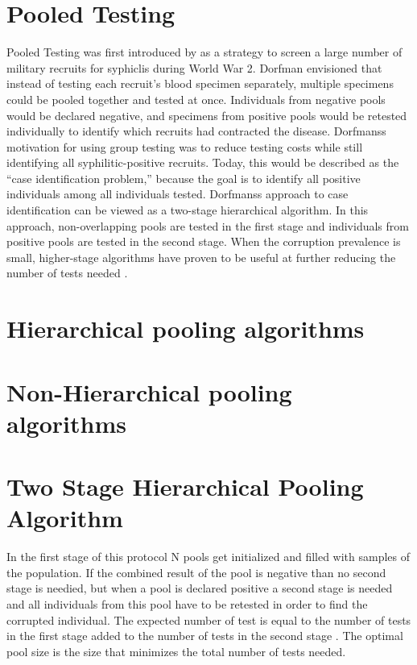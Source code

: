 \section{Pooled Testing}
Pooled Testing was first introduced by \cite{dorfman1943detection} as a strategy to screen a large number of military recruits for syphiclis during World War 2. Dorfman envisioned that instead of testing each recruit's blood specimen separately, multiple specimens could be pooled together and tested at once. Individuals from negative pools would be declared negative, and specimens from positive pools would be retested individually to identify which recruits had contracted the disease. Dorfmanss motivation for using group testing was to reduce testing costs while still identifying all syphilitic-positive recruits. Today, this would be described as the “case identification problem,” because the goal is to identify all positive individuals among all individuals tested. Dorfmanss approach to case identification can be viewed as a two-stage hierarchical algorithm. In this approach, non-overlapping pools are tested in the first stage and individuals from positive pools are tested in the second stage. When the corruption prevalence is small, higher-stage algorithms have proven to be useful at further reducing the number of tests needed \cite[1]{hou2017hierarchical}.
\section{Hierarchical pooling algorithms}
\section{Non-Hierarchical pooling algorithms}
\section{Two Stage Hierarchical Pooling Algorithm} \label{two-stage-hierarchical}
In the first stage of this protocol N pools get initialized and filled with samples of the population. If the combined result of the pool is negative than no second stage is needied, but when a pool is declared positive a second stage is needed and all individuals from this pool have to be retested in order to find the corrupted individual. The expected number of test is equal to the number of tests in the first stage added to the number of tests in the second stage \cite[3]{nianogo2021optimal}. The optimal pool size is the size that minimizes the total number of tests needed.
